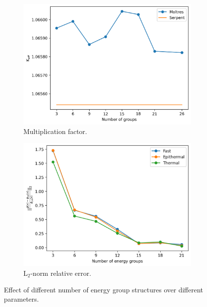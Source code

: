 \documentclass[11pt,letterpaper]{article}
\begin{document}
\begin{figure}[htbp!]
	\centering
	\begin{subfigure}[t]{0.4\textwidth}
		\centering
		\includegraphics[width=\linewidth]{figures/keff-LBP-1200}
		\caption{Multiplication factor.}
	\end{subfigure}
	\begin{subfigure}[t]{0.4\textwidth}
		\centering
		\includegraphics[width=\linewidth]{figures/LBP-1200-er-final}
		\caption{L$_2$-norm relative error.}
	\end{subfigure}
	\hfill
	\caption{Effect of different number of energy group structures over different parameters.}
	\label{fig:assembly-LBP-1200}
\end{figure}
\end{document}
